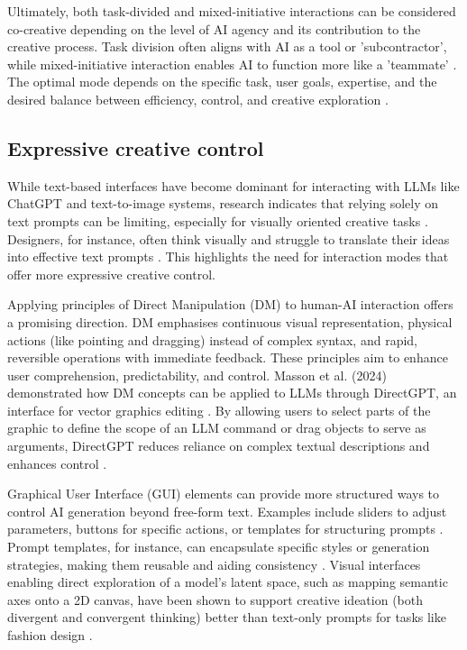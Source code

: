 Ultimately, both task-divided and mixed-initiative interactions can be considered co-creative depending on the level of AI agency and its contribution to the creative process. Task division often aligns with AI as a tool or 'subcontractor', while mixed-initiative interaction enables AI to function more like a 'teammate' \cite{Lin2023-zq}. The optimal mode depends on the specific task, user goals, expertise, and the desired balance between efficiency, control, and creative exploration \cite{Moruzzi2024-cq, Ding2024-kg, Weisz2024-io}.

\subsection{Expressive creative control}

While text-based interfaces have become dominant for interacting with LLMs like ChatGPT and text-to-image systems, research indicates that relying solely on text prompts can be limiting, especially for visually oriented creative tasks \cite{Park2024-gw, Tholander2023-rv, Verheijden2023-gn}. Designers, for instance, often think visually and struggle to translate their ideas into effective text prompts \cite{Park2024-gw, Peng2024-tr}. This highlights the need for interaction modes that offer more expressive creative control. 

Applying principles of Direct Manipulation (DM) \cite{Shneiderman1997-pu, Shneiderman1997-tv} to human-AI interaction offers a promising direction. DM emphasises continuous visual representation, physical actions (like pointing and dragging) instead of complex syntax, and rapid, reversible operations with immediate feedback. These principles aim to enhance user comprehension, predictability, and control. Masson et al. (2024) demonstrated how DM concepts can be applied to LLMs through DirectGPT, an interface for vector graphics editing \cite{Masson2024-nt}. By allowing users to select parts of the graphic to define the scope of an LLM command or drag objects to serve as arguments, DirectGPT reduces reliance on complex textual descriptions and enhances control \cite{Masson2024-nt}. 

Graphical User Interface (GUI) elements can provide more structured ways to control AI generation beyond free-form text. Examples include sliders to adjust parameters, buttons for specific actions, or templates for structuring prompts \cite{Ding2024-ta, Chang2023-tv, Moruzzi2024-cq}. Prompt templates, for instance, can encapsulate specific styles or generation strategies, making them reusable and aiding consistency \cite{Chang2023-tv}. Visual interfaces enabling direct exploration of a model's latent space, such as mapping semantic axes onto a 2D canvas, have been shown to support creative ideation (both divergent and convergent thinking) better than text-only prompts for tasks like fashion design \cite{Davis2024-ml}. 

